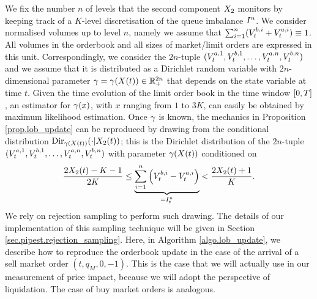 \documentclass[10pt]{article}
\begin{document}
We fix the number $n$ of levels that the second component $\stateVariable_2$ monitors by keeping track of a $K$-level discretisation of the queue imbalance $\volumeImbalance^n$. We consider normalised volumes up to level $n$, namely we assume that $\sum_{i=1}^{n} (\nthBestBidVolume[i]_t + \nthBestAskVolume[i]_t) \equiv 1$. All volumes in the orderbook and all sizes of market/limit orders are expressed in this unit.  Correspondingly, we consider the $2n$-tuple $(\nthBestAskVolume[1]_t,\nthBestBidVolume[1]_t, \dots, \nthBestAskVolume[n]_t,\nthBestBidVolume[n]_t)$ and we assume that it is distributed as a Dirichlet random variable with $2n$-dimensional parameter $\dirichletParam=\dirichletParam(\stateVariable(t)) \in \R_{+}^{2n}$ that depends on the state variable at time $t$. Given the time evolution of the limit order book in the time window $\timeWindow$, an estimator for $\dirparam(x)$, with $x$ ranging from $1$ to $3K$, can easily be obtained by maximum likelihood estimation. Once $\dirparam$ is known, the mechanics in Proposition \ref{prop.lob_update} can be reproduced by drawing from the conditional distribution $\text{Dir}_{\dirichletParam(\stateVariable(t))}(\cdot \vert \stateVariable_2 (t) )$; this is the Dirichlet distribution of  the $2n$-tuple $(\nthBestAskVolume[1]_t,\nthBestBidVolume[1]_t, \dots, \nthBestAskVolume[n]_t,\nthBestBidVolume[n]_t)$ with parameter $\dirparam(\stateVariable(t))$ conditioned on 
\begin{equation*}
 \frac{2\stateVariable_2(t) - K - 1}{2K}
 \leq 
 \underbrace{\sum_{i=1}^{n} \left( \nthBestBidVolume[i]_t - \nthBestAskVolume[i]_t \right)}_{= \volumeImbalance^n_t}
 <
 \frac{2\stateVariable_2(t) +1}{K}.
\end{equation*}
We rely on rejection sampling to perform such drawing. The details of our implementation of this sampling technique will be given in Section \ref{sec.pipest.rejection_sampling}. 
Here, in Algorithm \ref{algo.lob_update}, we describe how to reproduce the orderbook update in the case of the arrival of a sell market order $(t,q_M, 0, -1)$. This is the case that we will actually use in our measurement of price impact, because we will adopt the perspective of liquidation. The case of buy market orders is analogous. 
\end{document}
